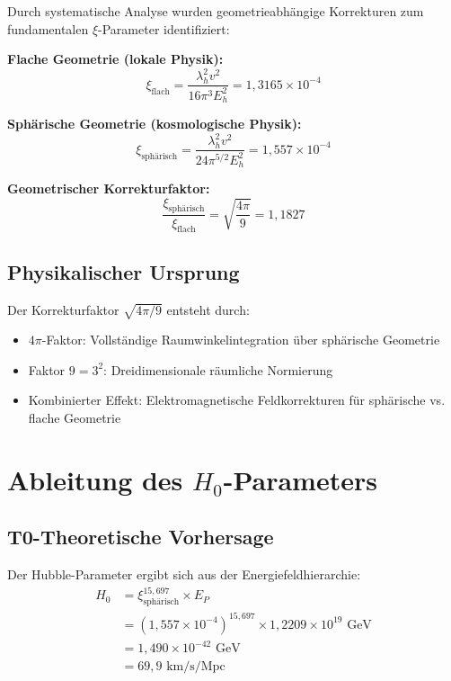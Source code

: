 \documentclass[12pt,a4paper]{article}
\begin{document}
	Durch systematische Analyse wurden geometrieabhängige Korrekturen zum fundamentalen $\xi$-Parameter identifiziert:
	
	\begin{tcolorbox}[colback=blue!5!white,colframe=blue!75!black,title=Geometrieabhängige $\xi$-Parameter]
		\textbf{Flache Geometrie (lokale Physik):}
		\begin{equation}
			\xi_{\text{flach}} = \frac{\lambda_h^2 v^2}{16\pi^3 E_h^2} = 1{,}3165 \times 10^{-4}
		\end{equation}
		
		\textbf{Sphärische Geometrie (kosmologische Physik):}
		\begin{equation}
			\xi_{\text{sphärisch}} = \frac{\lambda_h^2 v^2}{24\pi^{5/2} E_h^2} = 1{,}557 \times 10^{-4}
		\end{equation}
		
		\textbf{Geometrischer Korrekturfaktor:}
		\begin{equation}
			\frac{\xi_{\text{sphärisch}}}{\xi_{\text{flach}}} = \sqrt{\frac{4\pi}{9}} = 1{,}1827
		\end{equation}
	\end{tcolorbox}
	
	\subsection{Physikalischer Ursprung}
	Der Korrekturfaktor $\sqrt{4\pi/9}$ entsteht durch:
	\begin{itemize}
		\item $4\pi$-Faktor: Vollständige Raumwinkelintegration über sphärische Geometrie
		\item Faktor $9 = 3^2$: Dreidimensionale räumliche Normierung
		\item Kombinierter Effekt: Elektromagnetische Feldkorrekturen für sphärische vs. flache Geometrie
	\end{itemize}
	
	\section{Ableitung des $H_0$-Parameters}
	
	\subsection{T0-Theoretische Vorhersage}
	Der Hubble-Parameter ergibt sich aus der Energiefeldhierarchie:
	\begin{align}
		H_0 &= \xi_{\text{sphärisch}}^{15{,}697} \times E_P \\
		&= (1{,}557 \times 10^{-4})^{15{,}697} \times 1{,}2209 \times 10^{19} \text{ GeV} \\
		&= 1{,}490 \times 10^{-42} \text{ GeV} \\
		&= \boxed{69{,}9 \text{ km/s/Mpc}}
	\end{align}
	
\end{document}
